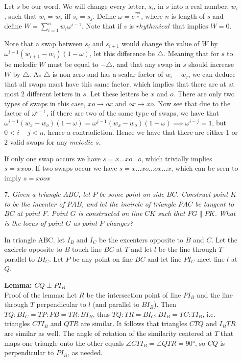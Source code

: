 \documentclass{article}
\begin{document}
\begin{enumerate}
Let $s$ be our word. We will change every letter, $s_i$, in $s$ into a real number, $w_i$, such that $w_i = w_j$ iff $s_i = s_j$. Define $\omega=e^{\frac{2 \pi i}{n}}$, where $n$ is length of $s$ and define ${W=\sum_{i=1}^n}w_i \omega^{i-1}$. Note that if $s$ is $rhythmical$ that implies $W = 0$.   

Note that a swap between $s_i$ and $s_{i+1}$ would change the value of $W$ by $\omega^{i-1}(w_{i+1} -w_i)(1-\omega)$, let this difference be $\triangle$. Meaning that for $s$ to be melodic $W$ must be equal to $-\triangle$, and that any swap in $s$ should increase $W$ by $\triangle$. As $\triangle$ is non-zero and has a scalar factor of $w_i-w_j$, we can deduce that all swaps must have this same factor, which implies that there are at at most $2$ different letters in $s$. Let these letters be $x$ and $o$. There are only two types of swaps in this case, $xo\rightarrow ox$ and $ox\rightarrow xo$. Now see that due to the factor of $\omega^{i-1}$, if there are two of the same type of swaps, we have that  $\omega^{i-1}(w_x -w_o)(1-\omega) = \omega^{j-1}(w_x -w_o)(1-\omega) \implies \omega^{i-j} = 1$, but $0<i-j<n$, hence a contradiction. Hence we have that there are either $1$ or $2$ valid swaps for any $melodic$ $s$.

If only one swap occurs we have $s = x\ldots xo \ldots o$, which trivially implies $s = xxoo$. 
If two swaps occur we have  $s = x\ldots xo \ldots ox \ldots x$, which can be seen to imply  $s = xoox$

\medskip
\item[7.] %
\textit{Given a triangle $ABC$, let $P$ be some point on side $BC$. Construct point $K$ to be the incenter of $PAB$, and let the incircle of triangle $PAC$ be tangent to $BC$ at point $F$. Point $G$ is constructed on line $CK$ such that $FG \parallel PK$. What is the locus of point $G$ as point $P$ changes?}

In triangle ABC, let $I_B$ and $I_C$ be the excenters opposite to $B$ and $C$. Let the excircle opposite to $B$ touch line $BC$ at $T$ and let $l$ be the line through $T$ parallel to $BI_C$. Let $P$ be any point on line $BC$ and let line $PI_C$ meet line $l$ at $Q$.

\textbf{Lemma: $CQ \perp PI_B$} \\
Proof of the lemma: Let $R$ be the intersection point of line $PI_B$ and the line through $T$ perpendicular to $l$ (and parallel to $BI_B$). 
Then $TQ : BI_C = TP : PB = TR : BI_B$, thus $TQ : TR = BI_C : BI_B = TC : TI_B$, i.e. triangles $CTI_B$ and $QTR$ are similar. It follows that triangles $CTQ$ and $I_BTR$ are similar as well. 
The angle of rotation of the similarity centered at $T$ that maps one triangle onto the other equals $\angle CTI_B = \angle QTR = 90 \si{\degree}$, so $CQ$ is perpendicular to $PI_B$, as needed.


\end{enumerate}
\end{document}
